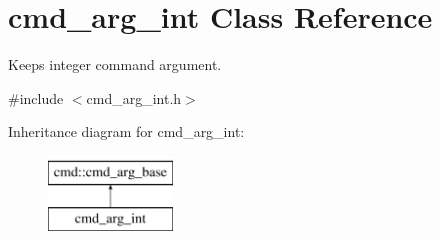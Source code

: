 \hypertarget{classcmd__arg__int}{\section{cmd\-\_\-arg\-\_\-int Class Reference}
\label{classcmd__arg__int}
}


Keeps integer command argument.  




{\ttfamily \#include $<$cmd\-\_\-arg\-\_\-int.\-h$>$}

Inheritance diagram for cmd\-\_\-arg\-\_\-int\-:\begin{figure}[H]
\begin{center}
\leavevmode
\includegraphics[height=2.000000cm]{classcmd__arg__int}
\end{center}
\end{figure}
